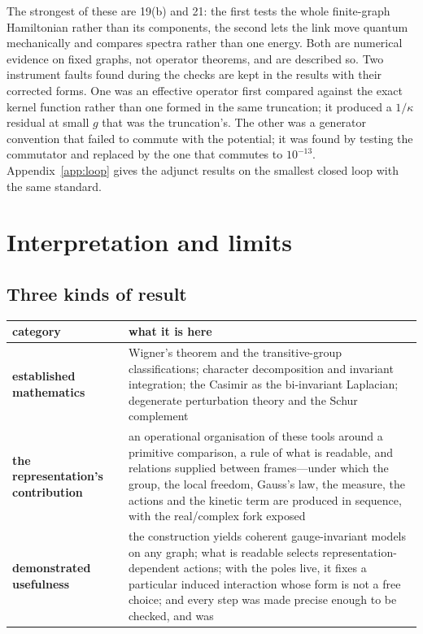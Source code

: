 \documentclass[11pt,a4paper]{article}
\theoremstyle{plain}
\theoremstyle{definition}
\theoremstyle{remark}
\begin{document}
The strongest of these are 19(b) and 21: the first tests the whole finite-graph Hamiltonian rather than its components, the second lets the link move quantum mechanically and compares spectra rather than one energy. Both are numerical evidence on fixed graphs, not operator theorems, and are described so. Two instrument faults found during the checks are kept in the results with their corrected forms. One was an effective operator first compared against the exact kernel function rather than one formed in the same truncation; it produced a $1/\kappa$ residual at small $g$ that was the truncation's. The other was a generator convention that failed to commute with the potential; it was found by testing the commutator and replaced by the one that commutes to $10^{-13}$. Appendix~\ref{app:loop} gives the adjunct results on the smallest closed loop with the same standard.

\section{Interpretation and limits}\label{sec:interp}

\subsection{Three kinds of result}

\begin{center}\small
\begin{tabular}{@{}>{\raggedright\arraybackslash}p{3.6cm}>{\raggedright\arraybackslash}p{11.6cm}@{}}
\toprule
category & what it is here\\
\midrule
\textbf{established mathematics} & Wigner's theorem and the transitive-group classifications; character decomposition and invariant integration; the Casimir as the bi-invariant Laplacian; degenerate perturbation theory and the Schur complement\\
\addlinespace
\textbf{the representation's contribution} & an operational organisation of these tools around a primitive comparison, a rule of what is readable, and relations supplied between frames---under which the group, the local freedom, Gauss's law, the measure, the actions and the kinetic term are produced in sequence, with the real/complex fork exposed\\
\addlinespace
\textbf{demonstrated usefulness} & the construction yields coherent gauge-invariant models on any graph; what is readable selects representation-dependent actions; with the poles live, it fixes a particular induced interaction whose form is not a free choice; and every step was made precise enough to be checked, and was\\
\bottomrule
\end{tabular}
\end{center}
\end{document}
